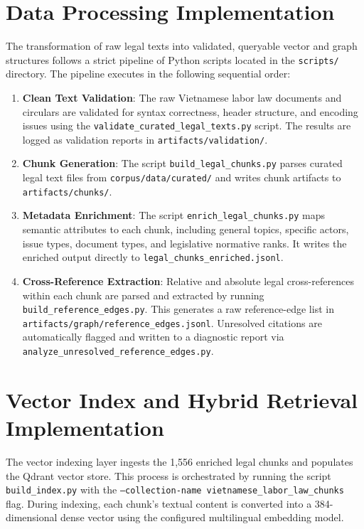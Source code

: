 \section{Data Processing Implementation}
The transformation of raw legal texts into validated, queryable vector and graph structures follows a strict pipeline of Python scripts located in the \texttt{scripts/} directory. The pipeline executes in the following sequential order:

\begin{enumerate}
  \item \textbf{Clean Text Validation}: The raw Vietnamese labor law documents and circulars are validated for syntax correctness, header structure, and encoding issues using the \texttt{validate\_curated\_legal\_texts.py} script. The results are logged as validation reports in \texttt{artifacts/validation/}.
  \item \textbf{Chunk Generation}: The script \texttt{build\_legal\_chunks.py} parses curated legal text files from \texttt{corpus/data/curated/} and writes chunk artifacts to \texttt{artifacts/chunks/}.
  \item \textbf{Metadata Enrichment}: The script \texttt{enrich\_legal\_chunks.py} maps semantic attributes to each chunk, including general topics, specific actors, issue types, document types, and legislative normative ranks. It writes the enriched output directly to \texttt{legal\_chunks\_enriched.jsonl}.
  \item \textbf{Cross-Reference Extraction}: Relative and absolute legal cross-references within each chunk are parsed and extracted by running \texttt{build\_reference\_edges.py}. This generates a raw reference-edge list in \texttt{artifacts/graph/reference\_edges.jsonl}. Unresolved citations are automatically flagged and written to a diagnostic report via \texttt{analyze\_unresolved\_reference\_edges.py}.
\end{enumerate}

\section{Vector Index and Hybrid Retrieval Implementation}
The vector indexing layer ingests the 1,556 enriched legal chunks and populates the Qdrant vector store. This process is orchestrated by running the script \texttt{build\_index.py} with the \texttt{--collection-name vietnamese\_labor\_law\_chunks} flag. During indexing, each chunk's textual content is converted into a 384-dimensional dense vector using the configured multilingual embedding model.

